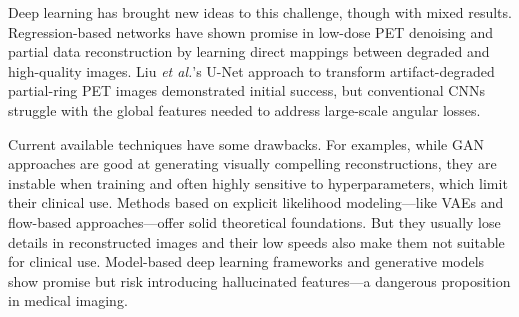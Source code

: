 \documentclass[
reprint,
superscriptaddress,
nofootinbib,
amsmath,amssymb,
aps,
prd,
]{revtex4-2}
\begin{document}
Deep learning has brought new ideas to this challenge, though with mixed results. Regression-based networks have shown promise in low-dose PET denoising and partial data reconstruction \cite{Kandarpa_2021} by learning direct mappings between degraded and high-quality images. Liu \textit{et al.}'s U-Net approach to transform artifact-degraded partial-ring PET images \cite{liu2019} demonstrated initial success, but conventional CNNs struggle with the global features needed to address large-scale angular losses. 

Current available techniques have some drawbacks.
For examples, while GAN approaches are good at generating visually compelling reconstructions, \cite{xue2023cg3dsrganclassificationguided3d} they are instable when training and often highly sensitive to hyperparameters, which limit their clinical use.
Methods based on explicit likelihood modeling—like VAEs and flow-based approaches—offer solid theoretical foundations. But they usually lose details in reconstructed images and their low speeds also make them not suitable for clinical use.
Model-based deep learning frameworks and generative models \cite{reader2023, vashistha2024} show promise but risk introducing hallucinated features—a dangerous proposition in medical imaging.
\end{document}
